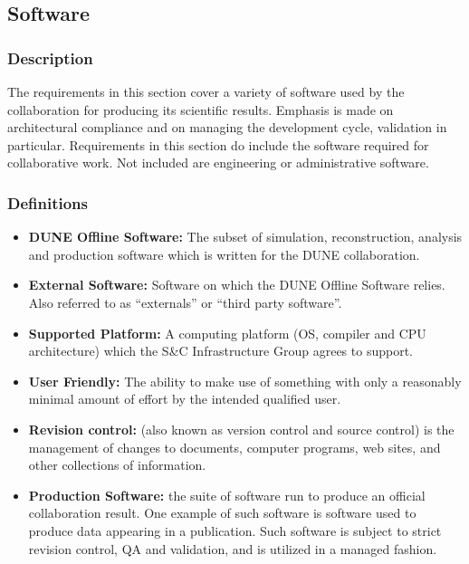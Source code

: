 \subsection{Software}
\subsubsection{Description}
The requirements in this section cover a variety of software used by the collaboration for producing its scientific results. Emphasis is made on architectural compliance and on managing the development cycle, validation in particular. Requirements in this section do include the software required for collaborative work. Not included are engineering or administrative software.


\subsubsection{Definitions}

\begin{itemize}
\item \textbf{DUNE Offline Software:} The subset of simulation, reconstruction, analysis and production software which is written for the DUNE collaboration.

\item \textbf{External Software:}  Software on which the DUNE Offline Software relies.  Also referred to as ``externals'' or ``third party software''.

\item \textbf{Supported Platform:} A computing platform (OS, compiler and CPU architecture) which the S\&C Infrastructure Group agrees to support.

\item \textbf{User Friendly:} The ability to make use of something with only a reasonably minimal amount of effort by the intended qualified user.

\item \textbf{Revision control:} (also known as version control and source control) is the management of changes to documents, computer programs, web sites, and other collections of information.

\item \textbf{Production Software:} the suite of software run to produce an official collaboration result. One example of such software is software used to produce data appearing in a publication. Such software is subject to strict revision control, QA and validation, and is utilized in a managed fashion.

\end{itemize}

